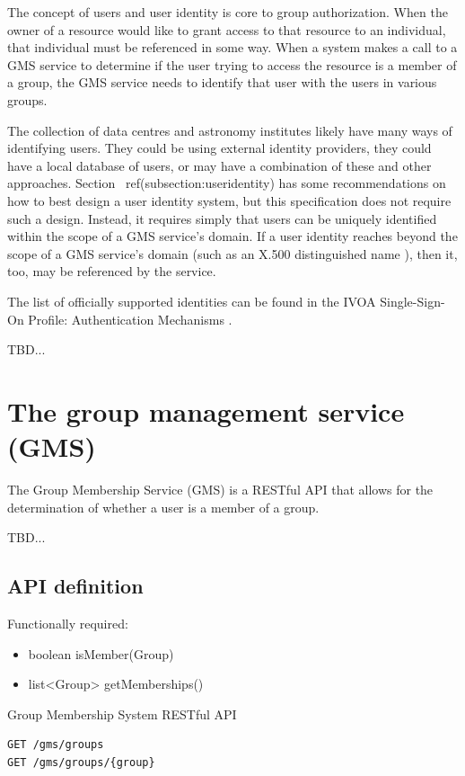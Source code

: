 \documentclass[11pt,a4paper]{ivoa}
\begin{document}
The concept of users and user identity is core to group authorization.  When the owner of a resource would like to grant access to that resource to an individual, that individual must be referenced in some way.  When a system makes a call to a GMS service to determine if the user trying to access the resource is a member of a group, the GMS service needs to identify that user with the users in various groups.  

The collection of data centres and astronomy institutes likely have many ways of identifying users.  They could be using external identity providers, they could have a local database of users, or may have a combination of these and other approaches.  Section ~ref(subsection:useridentity) has some recommendations on how to best design a user identity system, but this specification does not require such a design.  Instead, it requires simply that users can be uniquely identified within the scope of a GMS service's domain.  If a user identity reaches beyond the scope of a GMS service's domain (such as an X.500 distinguished name \citep{std:RFC1779}), then it, too, may be referenced by the service.

The list of officially supported identities can be found in the IVOA Single-Sign-On Profile: Authentication Mechanisms \citep{std:SSOAUTH}.

TBD...

\section{The group management service (GMS)}

The Group Membership Service (GMS) is a RESTful API that allows for the determination of whether a user is a member of a group.

TBD...

\subsection{API definition}

Functionally required:
\begin{itemize}
\item boolean isMember(Group)
\item list<Group> getMemberships()
\end{itemize}

Group Membership System RESTful API
\begin{verbatim}
GET /gms/groups
GET /gms/groups/{group}
\end{verbatim}
\end{document}
